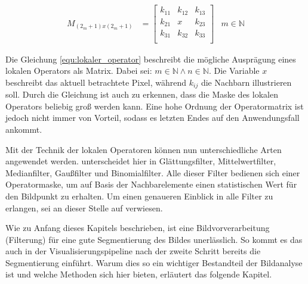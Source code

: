 \begin{align}
	\label{equ:lokaler_operator}M_{(2_m+1)x(2_m+1)} & = \begin{bmatrix}k_{11}&k_{12}&k_{13}\\ k_{21}&x&k_{23}\\ k_{31}&k_{32}&k_{33}\\\end{bmatrix} & m \in \mathbb{N}
\end{align}

Die Gleichung \ref{equ:lokaler_operator} beschreibt die mögliche Ausprägung eines
lokalen Operators als Matrix. Dabei sei: $m \in \mathbb{N}\wedge n \in \mathbb{N}$.
Die Variable $x$ beschreibt das aktuell betrachtete Pixel, während $k_{ij}$ die Nachbarn
illustrieren soll. Durch die Gleichung ist auch zu erkennen, dass die Maske des lokalen
Operators beliebig groß werden kann. Eine hohe Ordnung der Operatormatrix ist
jedoch nicht immer von Vorteil, sodass es letzten Endes auf den Anwendungsfall ankommt.

Mit der Technik der lokalen Operatoren können nun unterschiedliche Arten angewendet
werden. \citet[S.~54 - 55]{handels2000} unterscheidet hier in Glättungsfilter,
Mittelwertfilter, Medianfilter, Gaußfilter und Binomialfilter. Alle dieser Filter
bedienen sich einer Operatormaske, um auf Basis der Nachbarelemente einen
statistischen Wert für den Bildpunkt zu erhalten. Um einen genaueren Einblick in
alle Filter zu erlangen, sei an dieser Stelle auf \citet[S.~54 - 55]{handels2000}
verwiesen.

Wie zu Anfang dieses Kapitels beschrieben, ist eine Bildvorverarbeitung (Filterung)
für eine gute Segmentierung des Bildes unerlässlich. So kommt es das auch in der
Visualisierungspipeline nach \citet[S.~50]{handels2000} der zweite Schritt
bereits die Segmentierung einführt. Warum dies so ein wichtiger Bestandteil der Bildanalyse
ist und welche Methoden sich hier bieten, erläutert das folgende Kapitel.

\pagebreak

